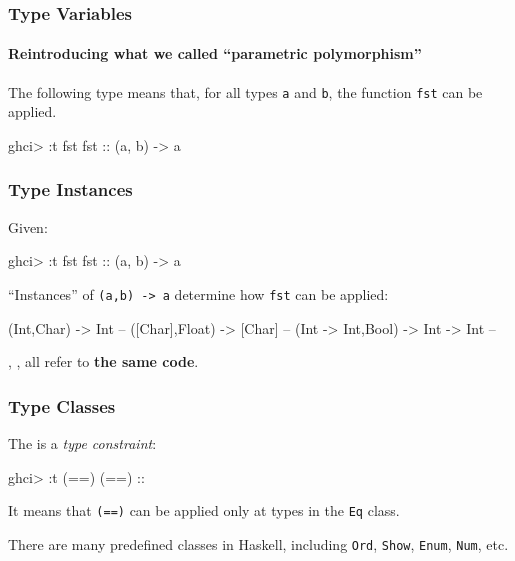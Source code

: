 \documentclass{beamer}
\newenvironment{codeblock}[1][.8]{%
\begin{columns}
\begin{column}{#1\linewidth}
\begin{exampleblock}{}}{%
\end{exampleblock}
\end{column}
\end{columns}}
\begin{document}
\begin{frame}[fragile]
\frametitle{Type Variables}
\framesubtitle{Reintroducing what we called ``parametric polymorphism''}

The following type means that, for all types \verb+a+ and \verb+b+, the function \verb+fst+ can be applied.
\begin{hcode}
ghci> :t fst  
fst :: (a, b) -> a 
\end{hcode}

\end{frame}

\begin{frame}[fragile]
\frametitle{Type Instances}

Given:
\begin{hcode}
ghci> :t fst  
fst :: (a, b) -> a 
\end{hcode}

``Instances'' of \verb+(a,b) -> a+ determine how \verb+fst+ can be applied:
\begin{hcode}
  (Int,Char) -> Int                -- %
  ([Char],Float) -> [Char]         -- %
  (Int -> Int,Bool) -> Int -> Int  -- %
\end{hcode}

{\tt{\color{red}{fst}}}, 
{\tt{\color{blue}{fst}}}, 
{\tt{\color{green}{fst}}} all refer to {\bf the same code}.

\end{frame}


\begin{frame}[fragile]
\frametitle{Type Classes}

The {\color{red}{following}} is a \emph{type constraint}:
\begin{hcode}
ghci> :t (==)  
(==) :: %
\end{hcode}

\vfill
It means that \verb+(==)+ can be applied only at types in the \verb+Eq+ class.

\vfill There are many predefined classes in Haskell, including
\verb+Ord+, \verb+Show+, \verb+Enum+, \verb+Num+, etc.

\end{frame}
\end{document}

